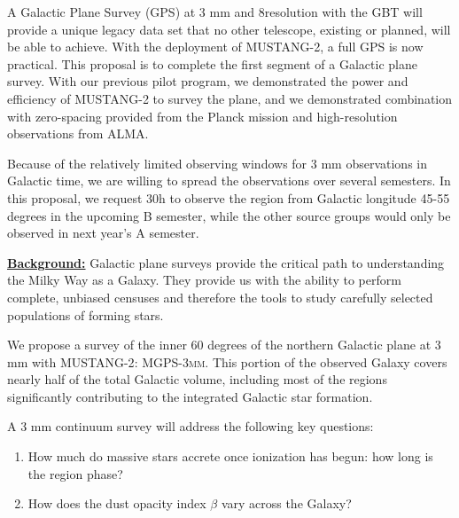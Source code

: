 \documentclass[11pt,preprint]{aastex_nofoot}
\newcommand{\MUSTANG}{\textsc{MUSTANG-2}\xspace}
\newcommand{\MGPS}{\textsc{MGPS-3mm}\xspace}
\begin{document}


A Galactic Plane Survey (GPS) at 3 mm and 8\arcsec resolution with the GBT will provide a
unique legacy data set that no other telescope, existing or planned, will be
able to achieve.  With the deployment of \MUSTANG, a full GPS is now practical.  This
proposal is to complete the first segment of a Galactic plane survey.  With
our previous pilot program, we demonstrated the power and efficiency of \MUSTANG
to survey the plane, and we demonstrated combination with zero-spacing provided
from the Planck mission and high-resolution observations from ALMA.

Because of the relatively limited observing windows for 3 mm observations in
Galactic time, we are willing to spread the observations over several
semesters.  In this proposal, we request 30h to observe the region from
Galactic longitude 45-55 degrees in the upcoming B semester, while the other
source groups would only be observed in next year's A semester.

\underline{\bf Background:}
Galactic plane surveys provide the critical path to understanding the Milky Way
as a Galaxy.  They provide us with the ability to perform complete, unbiased
censuses and therefore the tools to study carefully selected populations of forming stars.

We propose a survey of the inner 60 degrees of the northern
Galactic plane at 3 mm with \MUSTANG: \MGPS.  This portion of the observed Galaxy covers
nearly half of the total Galactic volume, including most of the regions significantly
contributing to the integrated Galactic star formation.

A 3 mm continuum survey will address the following key questions:

\vspace{-2.5mm}

\begin{enumerate}

    \item How much do massive stars accrete once ionization has begun: how long
        is the \hchii region phase?
    \item How does the dust opacity index $\beta$  vary across the Galaxy?  

\end{enumerate}
\vspace{-2.5mm}
\end{document}
